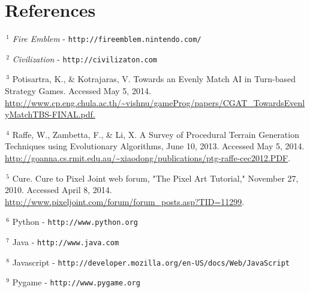\documentclass{article}
\begin{document}
\section*{References}

\noindent
$\,^1$
\emph{Fire Emblem} - {\tt http://fireemblem.nintendo.com/}

\vspace{.3em}

\noindent
$\,^2$
\emph{Civilization} - {\tt http://civilizaton.com}

\vspace{.3em}

\noindent
\hangindent=1cm
$\,^3$
Potisartra, K., \& Kotrajaras, V. Towards an Evenly Match AI in Turn-based Strategy Games. Accessed May 5, 2014. \url{http://www.cp.eng.chula.ac.th/~vishnu/gameProg/papers/CGAT_TowardsEvenlyMatchTBS-FINAL.pdf.}

\vspace{.3em}

\noindent
\hangindent=1cm
$\,^4$
Raffe, W., Zambetta, F., \& Li, X. A Survey of Procedural Terrain Generation Techniques using Evolutionary Algorithms, June 10, 2013. Accessed May 5, 2014. \url{http://goanna.cs.rmit.edu.au/~xiaodong/publications/ptg-raffe-cec2012.PDF}.

\vspace{.3em}

\noindent
\hangindent=1cm
$\,^5$
Cure. Cure to Pixel Joint web forum, "The Pixel Art Tutorial," November 27, 2010. Accessed April 8, 2014. \url{http://www.pixeljoint.com/forum/forum_posts.asp?TID=11299}. 

\vspace{.3em}

\noindent
$\,^6$
Python - {\tt http://www.python.org}

\vspace{.3em}

\noindent
$\,^7$
Java - {\tt http://www.java.com}

\vspace{.3em}

\noindent
$\,^8$
Javascript - {\tt http://developer.mozilla.org/en-US/docs/Web/JavaScript}

\vspace{.3em}

\noindent
$\,^9$
Pygame - {\tt http://www.pygame.org}

\vspace{.3em}
\end{document}
